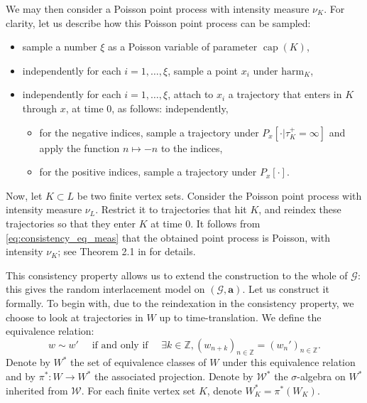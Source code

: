 \documentclass[12pt,a4paper]{article}
\newcommand{\1}[1]{{\mathbf 1}{\{#1\}}}
\newcommand{\Z}{{\mathbb Z}}
\newcommand{\8}{{\infty}}
\newcommand{\capa}{\mathop{\mathrm{cap}}}
\newcommand{\harm}{\textrm{harm}}
\begin{document}
We may then consider a Poisson point process with intensity measure $\nu_K$. For clarity, let us describe how this Poisson point process can be sampled:
\begin{itemize}
\item sample a number $\xi$ as a Poisson variable of parameter $\capa(K)$,
\item independently for each $i=1,  \dots, \xi$, sample a point $x_i$ under $\harm_K$,
\item independently for each $i=1, \dots, \xi$, attach to $x_i$ a trajectory that enters in $K$ through $x$, at time 0, as follows: independently,
\begin{itemize}
  \item for the negative indices, sample a trajectory under $P_x[ \cdot | \tau_K^+=\infty]$ and apply the function $n\mapsto -n$ to the indices,
  \item for the positive indices, sample a trajectory under $P_x[ \cdot ]$.
\end{itemize}
\end{itemize}
Now, let $K\subset L$ be two finite vertex sets. Consider the Poisson point process with intensity measure $\nu_L$. Restrict it to trajectories that hit $K$, and reindex these trajectories so that they enter $K$ at time 0. It follows from \eqref{eq:consistency_eq_meas} that the obtained point process is Poisson, with intensity $\nu_K$; see Theorem 2.1 in \cite{Teixeira2009} for details.

This consistency property allows us to extend the construction to the whole of $\mathcal{G}$: this gives the random interlacement model on $(\mathcal{G}, \mathbf{a})$. Let us construct it formally. To begin with, due to the reindexation in the consistency property, we choose to look at trajectories in $W$ up to time-translation. We define the equivalence relation:
\begin{equation}
  w\sim w' \quad  \text{ if and only if } \quad \exists k\in \Z, (w_{n+k})_{n\in \Z}=(w_n')_{n\in \Z} .
\end{equation}
Denote by $W^*$ the set of equivalence classes of $W$ under this equivalence relation and by $\pi^*:W\to W^*$ the associated projection. Denote by $\mathcal{W}^*$ the $\sigma$-algebra on $W^*$ inherited from $\mathcal{W}$. For each finite vertex set $K$, denote $W_K^*= \pi^*(W_K)$.
\end{document}
